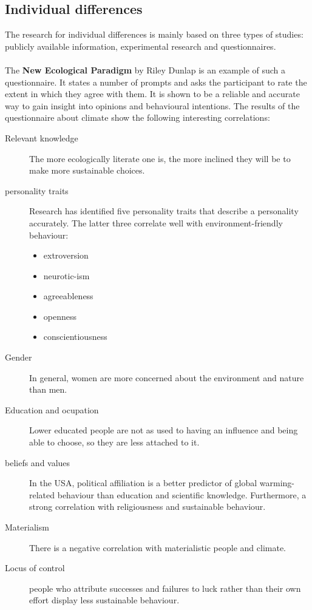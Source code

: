 \documentclass[../summary.tex]{subfiles}
\begin{document}
		\subsection{Individual differences}
			The research for individual differences is mainly based on three types of studies: publicly  available information, experimental research and questionnaires. \\
			\\
			The \textbf{New Ecological Paradigm}  by Riley Dunlap is an example of such a questionnaire. It states a number of prompts and asks the participant to rate the extent in which they agree with them. It is shown to be a reliable and accurate  way to gain insight into opinions and behavioural intentions. The results of the questionnaire about climate show the following interesting correlations:
			\begin{description}
				\item[Relevant knowledge] The more ecologically literate one is, the more inclined they will be to make more sustainable choices. 
				\item[personality traits] Research has identified five personality traits that describe a personality accurately. The latter three correlate well with environment-friendly behaviour:
				\begin{itemize}
					\item extroversion 
					\item neurotic-ism
					\item agreeableness
					\item openness
					\item conscientiousness				
				\end{itemize}
				\item[Gender] In general, women are more concerned about the environment and nature than men. 
				\item[Education and ocupation] Lower educated people are not as used to having an influence and being able to choose, so they are less attached to it. 
				\item[beliefs and values] In the USA, political affiliation is a better predictor of global warming-related behaviour than education and scientific knowledge. Furthermore, a strong correlation with religiousness and sustainable behaviour. 
				\item[Materialism] There is a negative correlation with materialistic people and climate.
				\item[Locus of control] people who attribute successes and failures to luck rather than their own effort display less sustainable behaviour. 
			\end{description}
			
\end{document}
